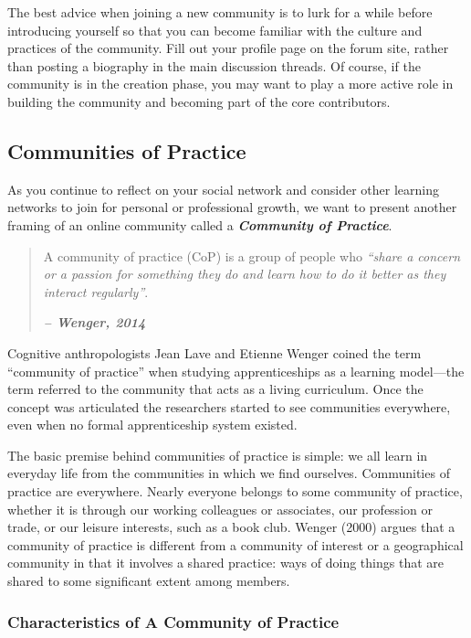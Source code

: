 \documentclass[
]{book}
\theoremstyle{definition}
\theoremstyle{definition}
\theoremstyle{definition}
\theoremstyle{definition}
\theoremstyle{remark}
\begin{document}
The best advice when joining a new community is to lurk for a while before introducing yourself so that you can become familiar with the culture and practices of the community. Fill out your profile page on the forum site, rather than posting a biography in the main discussion threads. Of course, if the community is in the creation phase, you may want to play a more active role in building the community and becoming part of the core contributors.

\hypertarget{communities-of-practice}{%
\subsection*{Communities of Practice}\label{communities-of-practice}}

As you continue to reflect on your social network and consider other learning networks to join for personal or professional growth, we want to present another framing of an online community called a \textbf{\emph{Community of Practice}}.

\begin{quote}
A community of practice (CoP) is a group of people who \emph{``share a concern or a passion for something they do and learn how to do it better as they interact regularly''}.

\textbf{\emph{-- Wenger, 2014}}
\end{quote}

Cognitive anthropologists Jean Lave and Etienne Wenger coined the term ``community of practice'' when studying apprenticeships as a learning model---the term referred to the community that acts as a living curriculum. Once the concept was articulated the researchers started to see communities everywhere, even when no formal apprenticeship system existed.

The basic premise behind communities of practice is simple: we all learn in everyday life from the communities in which we find ourselves. Communities of practice are everywhere. Nearly everyone belongs to some community of practice, whether it is through our working colleagues or associates, our profession or trade, or our leisure interests, such as a book club. Wenger (2000) argues that a community of practice is different from a community of interest or a geographical community in that it involves a shared practice: ways of doing things that are shared to some significant extent among members.

\hypertarget{characteristics-of-a-community-of-practice}{%
\subsubsection*{Characteristics of A Community of Practice}\label{characteristics-of-a-community-of-practice}}
\end{document}
